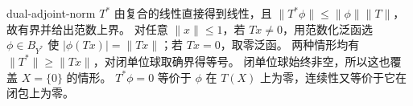 \begin{solution}{dual-adjoint-norm}
\(T^*\) 由复合的线性直接得到线性，且
\(\|T^*\phi\|\le\|\phi\|\|T\|\)，故有界并给出范数上界。
对任意 \(\|x\|\le1\)，若 \(Tx\ne0\)，用范数化泛函选
\(\phi\in B_{Y^*}\) 使 \(|\phi(Tx)|=\|Tx\|\)；若 \(Tx=0\)，取零泛函。
两种情形均有 \(\|T^*\|\ge\|Tx\|\)，对闭单位球取确界得等号。
闭单位球始终非空，所以这也覆盖 \(X=\{0\}\) 的情形。
\(T^*\phi=0\) 等价于 \(\phi\) 在 \(T(X)\) 上为零，连续性又等价于它在闭包上为零。
\end{solution}
